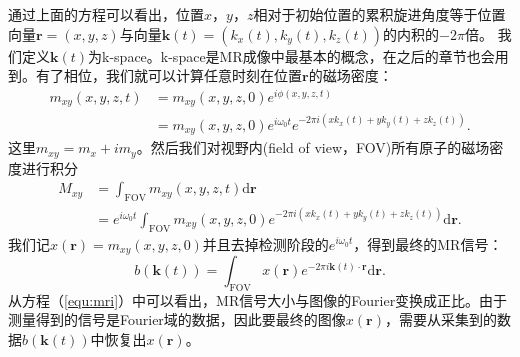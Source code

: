 通过上面的方程可以看出，位置$x$，$y$，$z$相对于初始位置的累积旋进角度等于位置向量$\mathrm{\textbf{r}}=(x,y,z)$与向量$\mathrm{\textbf{k}}(t)=(k_x(t),k_y(t),k_z(t))$的内积的$-2\pi$倍。
我们定义$\mathrm{\textbf{k}}(t)$为k-space。k-space是MR成像中最基本的概念，在之后的章节也会用到。有了相位，我们就可以计算任意时刻在位置$\mathrm{\textbf{r}}$的磁场密度：
\begin{equation}
	\begin{aligned}
		m_{xy}(x,y,z,t)&=m_{xy}(x,y,z,0)e^{i\phi(x,y,z,t)} \\
&=m_{xy}(x,y,z,0)e^{i\omega_0t}e^{-2\pi i(xk_x(t)+yk_y(t)+zk_z(t))}.
	\end{aligned}
\end{equation}
这里$m_{xy}=m_x+im_y$。然后我们对视野内(field of view，FOV)所有原子的磁场密度进行积分
\begin{equation}
	\begin{aligned}
		M_{xy}&=\int_{\mathrm{FOV}}m_{xy}(x,y,z,t)\mathrm{d}\mathrm{\textbf{r}} \\
&=e^{i\omega_0t}\int_{\mathrm{FOV}}m_{xy}(x,y,z,0)e^{-2\pi i(xk_x(t)+yk_y(t)+zk_z(t))}\mathrm{d}\mathrm{\textbf{r}}.
	\end{aligned}
\end{equation}
我们记$x(\mathrm{\textbf{r}})=m_{xy}(x,y,z,0)$并且去掉检测阶段的$e^{i\omega_0t}$，得到最终的MR信号：
\begin{equation}
	b(\mathrm{\textbf{k}}(t)) = \int_{\mathrm{FOV}}x(\mathrm{\textbf{r}})e^{-2\pi i\mathrm{\textbf{k}}(t) \cdot \mathrm{\textbf{r}}}\mathrm{d}\mathrm{\textbf{r}}.
	\label{equ:mri}
\end{equation}
从方程（\ref{equ:mri}）中可以看出，MR信号大小与图像的Fourier变换成正比。由于测量得到的信号是Fourier域的数据，因此要最终的图像$x(\mathrm{\textbf{r}})$，需要从采集到的数据$b(\mathrm{\textbf{k}}(t))$中恢复出$x(\mathrm{\textbf{r}})$。

